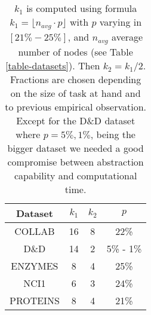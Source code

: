 \documentclass[runningheads]{llncs}
\begin{document}
\begin{table}
\centering
\caption{$k_1$ is computed using formula $k_1 = \lfloor n_{avg} \cdot p\rfloor $ with $p$ varying in $\left[21\% - 25\%\right]$, and $n_{avg}$ average number of nodes (see Table \ref{table-datasets}). Then $k_2 = k_1 / 2$. Fractions are chosen depending on the size of task at hand and to previous empirical observation. Except for the D\&D dataset where $p = 5\%, 1\%$, being the bigger dataset we needed a good compromise between abstraction capability and computational time.}\label{table-fractions}
\begin{tabular}{cccc} \toprule[1.5pt]
    {\bfseries{Dataset}} & {\bfseries{$k_1$}} & {\bfseries{$k_2$}} & {\bfseries{$p$}} \\ \midrule
    {COLLAB} & 16 & 8  & 22\% \\
    {D\&D} & 14 & 2  &  5\% - 1\% \\
    {ENZYMES} & 8 & 4 & 25\% \\
    {NCI1} & 6 & 3 & 24\% \\
    {PROTEINS} & 8 & 4 & 21\% \\ \bottomrule[1.5pt]
\end{tabular}
\end{table}
\end{document}
